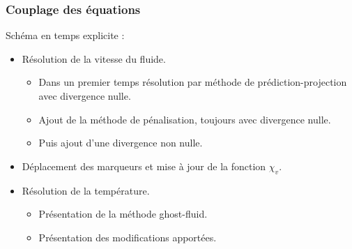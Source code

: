 \documentclass{beamer}
\begin{document}
\begin{frame}
    \frametitle{Couplage des équations}
        \footnotesize
        \begin{ceablock}{Schéma en temps explicite :}
        \begin{itemize}
            \item Résolution de la vitesse du fluide.
            			\begin{itemize}
				\item Dans un premier temps résolution par méthode de prédiction-projection avec divergence nulle.
				\item Ajout de la méthode de pénalisation, toujours avec divergence nulle.
				\item Puis ajout d'une divergence non nulle.
			\end{itemize}
            \item Déplacement des marqueurs et mise à jour de la fonction $\chi_v$.
            \item Résolution de la température.
            \begin{itemize}
            	\item Présentation de la méthode ghost-fluid.
            	\item Présentation des modifications apportées.
            \end{itemize}
        \end{itemize}
        \end{ceablock}
    
\end{frame}
\end{document}
